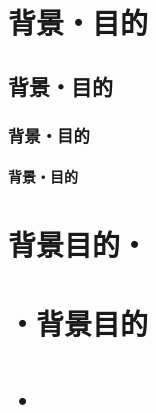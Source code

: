 \chapter{背景・目的}
\section{背景・目的}
\subsection{背景・目的}
\subsubsection{背景・目的}
\chapter{背景目的・}
\chapter{・背景目的}
\chapter{・}
\chapter{}